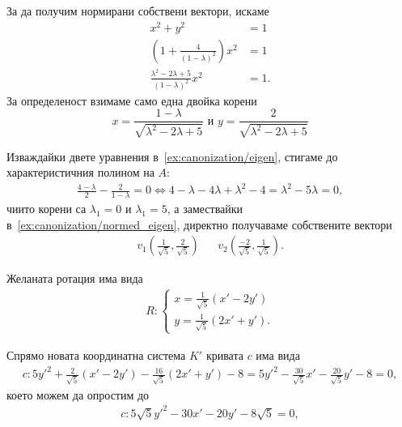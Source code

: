 \documentclass[numbers=endperiod, bibliography=totocnumbered]{scrartcl}
\begin{document}
\begin{solution}
\begin{enumerate}
    За да получим нормирани собствени вектори, искаме
    \begin{align*}
      x^2 + y^2 &= 1 \\
      \left(1 +  \frac 4 {{(1 - \lambda)}^2} \right) x^2 &= 1 \\
      \frac {\lambda^2 - 2\lambda + 5} {{(1 - \lambda)}^2} x^2 &= 1.
    \end{align*}
    За определеност взимаме само една двойка корени
    \begin{equation}
      \label{ex:canonization/normed_eigen}
      x = \frac {1 - \lambda} {\sqrt{\lambda^2 - 2\lambda + 5}}
      \text{ и }
      y = \frac 2 {\sqrt{\lambda^2 - 2\lambda + 5}}
    \end{equation}

    Изваждайки двете уравнения в~\ref{ex:canonization/eigen}, стигаме до характеристичния полином на \( A \):
    \begin{align*}
      \frac {4 - \lambda} 2 - \frac 2 {1 - \lambda} = 0 \iff 4 - \lambda - 4\lambda + \lambda^2 - 4 = \lambda^2 - 5\lambda = 0,
    \end{align*}
    чиито корени са \( \lambda_1 = 0 \) и \( \lambda_1 = 5 \), а замествайки в~\ref{ex:canonization/normed_eigen}, директно получаваме собствените вектори
    \begin{align*}
      v_1 \left(\frac 1 {\sqrt 5}, \frac 2 {\sqrt 5} \right)
      &&
      v_2 \left(\frac {-2} {\sqrt 5}, \frac 1 {\sqrt 5} \right).
    \end{align*}

    Желаната ротация има вида
    \begin{align*}
      R: \begin{cases}
        x = \frac 1 {\sqrt 5} (x' - 2y') \\
        y = \frac 1 {\sqrt 5} (2x' + y').
      \end{cases}
    \end{align*}

    Спрямо новата координатна система \( K' \) кривата \( c \) има вида
    \begin{align*}
      c: 5y'^2 + \frac 2 {\sqrt 5} (x' - 2y') - \frac {16} {\sqrt 5} (2x' + y') - 8 = 5y'^2 - \frac {30} {\sqrt 5} x' - \frac {20} {\sqrt 5} y' - 8 = 0,
    \end{align*}
    което можем да опростим до
    \begin{align*}
      c: 5 \sqrt 5 y'^2 - 30 x' - 20 y' - 8 \sqrt 5 = 0,
    \end{align*}


\end{enumerate}
\end{solution}
\end{document}
